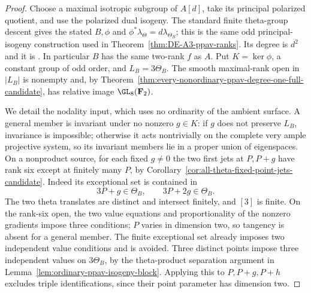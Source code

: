 \begin{proof}
Choose a maximal isotropic subgroup of $A[d]$, take its principal
polarized quotient, and use the polarized dual isogeny. The standard
finite theta-group descent gives the stated $B,\phi$ and
$\phi^*\lambda_\Theta=d\lambda_{\Theta_B}$; this is the same
odd principal-isogeny construction used in
Theorem~\ref{thm:DE-A3-ppav-ranks}. Its degree is $d^2$ and it is
\etale. In particular $B$ has the same two-rank $f$ as $A$.
Put $K=\ker\phi$, a constant group of odd order, and $L_B=3\Theta_B$.
The smooth maximal-rank open in $|L_B|$ is nonempty and, by
Theorem~\ref{thm:every-nonordinary-ppav-degree-one-full-candidate},
has relative image $\GL_8(\mathbf F_2)$.

We detail the nodality input, which uses no ordinarity of the ambient
surface. A general member is invariant under no nonzero $g\in K$:
if $g$ does not preserve $L_B$, invariance is impossible; otherwise
it acts nontrivially on the complete very ample projective system,
so its invariant members lie in a proper union of eigenspaces.
On a nonproduct source, for each fixed $g\ne0$ the two first jets
at $P,P+g$ have rank six except at finitely many $P$, by
Corollary~\ref{cor:all-theta-fixed-point-jets-candidate}.
Indeed its exceptional set is contained in
\[
                     3P+g\in\Theta_B,\qquad
                     3P+2g\in\Theta_B.
\]
The two theta translates are distinct and intersect finitely, and
$[3]$ is finite. On the rank-six open, the two value equations and
proportionality of the nonzero gradients impose three conditions;
$P$ varies in dimension two, so tangency is absent for a general
member. The finite exceptional set already imposes two independent
value conditions and is avoided. Three distinct points impose three
independent values on $3\Theta_B$, by the theta-product separation
argument in Lemma~\ref{lem:ordinary-ppav-isogeny-block}. Applying this
to $P,P+g,P+h$ excludes triple identifications, since their point
parameter has dimension two.


\end{proof}
